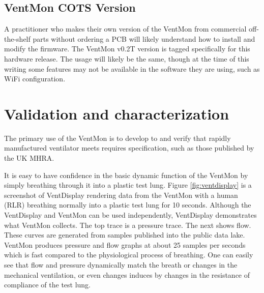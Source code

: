 \documentclass[11pt, letterpaper]{article}
\begin{document}
\subsection{VentMon COTS Version}

A practitioner who makes their own version of the VentMon from commercial off-the-shelf parts without ordering a PCB will likely understand how to install
and modify the firmware. The VentMon v0.2T\cite{VentMon02} version is tagged specifically for this hardware release. The usage will likely be the same, though at the time of this writing some features
may not be available in the software they are using, such as WiFi configuration.

\section{Validation and characterization}


The primary use of the VentMon is to develop to and verify that rapidly manufactured ventilator meets requires specification, such as those published by the UK MHRA\cite{mhra2020specification}.

It is easy to have confidence in the basic dynamic function of the VentMon by simply breathing through it into a plastic test lung. Figure \ref{fig:ventdisplay} is a screenshot of VentDisplay rendering data from the VentMon with a human (RLR) breathing normally into a plastic test lung for 10 seconds. Although the VentDisplay and VentMon can be used independently, VentDisplay demonstrates what VentMon collects. The top trace is a pressure trace. The next shows flow. These curves are generated from samples published into the public data lake. VentMon produces pressure and flow graphs at about 25 samples per seconds which is fast compared to the physiological process of breathing. One can easily see that flow and pressure dynamically match the breath or changes in the mechanical ventilation, or even changes induces by changes in the resistance of compliance of the test lung.
\end{document}
